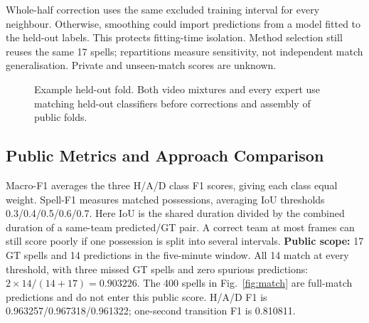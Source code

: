 \documentclass[conference,a4paper,10pt]{IEEEtran}
\begin{document}
Whole-half correction uses the same excluded training interval for every
neighbour. Otherwise, smoothing could import predictions from a model fitted
to the held-out labels. This protects fitting-time isolation. Method selection
still reuses the same 17 spells; repartitions measure sensitivity, not
independent match generalisation. Private and unseen-match scores are unknown.

\begin{figure}[!t]
\centering
{}
\caption{Example held-out fold. Both video mixtures and every expert use
matching held-out classifiers before corrections and assembly of public folds.}
\label{fig:validation}
\end{figure}





\balance
\subsection{Public Metrics and Approach Comparison}
Macro-F1 averages the three H/A/D class F1 scores, giving each class equal
weight. Spell-F1 measures matched possessions, averaging IoU thresholds
0.3/0.4/0.5/0.6/0.7. Here IoU is the shared duration divided by the combined
duration of a same-team predicted/GT pair. A correct team at most frames can
still score poorly if one possession is split into several intervals.
\textbf{Public scope:} 17 GT spells and 14 predictions in the five-minute window.
All 14 match at every threshold, with three missed GT spells and zero spurious
predictions: $2\times14/(14+17)=0.903226$. The 400 spells in Fig.~\ref{fig:match}
are full-match predictions and do not enter this public score.
H/A/D F1 is 0.963257/0.967318/0.961322; one-second transition F1 is 0.810811.
\end{document}
